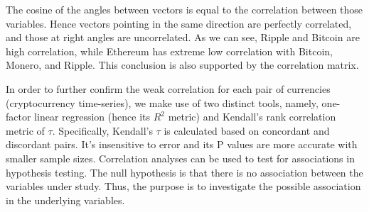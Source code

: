 \documentclass[12pt,twoside]{article}
\begin{document}
\bigbreak
The cosine of the angles between vectors is equal to the correlation between those variables. Hence vectors pointing in the same direction are perfectly correlated, and those at right angles are uncorrelated. As we can see, Ripple and Bitcoin are high correlation, while Ethereum has extreme low correlation with Bitcoin, Monero, and Ripple. This conclusion is also supported by the correlation matrix.

\bigbreak

In order to further confirm the weak correlation for each pair of currencies (cryptocurrency time-series), we make use of two distinct tools, namely, one-factor linear regression (hence its $R^2$ metric) and Kendall’s rank correlation metric of $\tau$. Specifically, Kendall's $\tau$ is calculated based on concordant and discordant pairs. It's insensitive to error and its P values are more accurate with smaller sample sizes. Correlation analyses can be used to test for associations in hypothesis testing.  The null hypothesis is that there is no association between the variables under study.  Thus, the purpose is to investigate the possible association in the underlying variables.
\bigbreak
\end{document}
